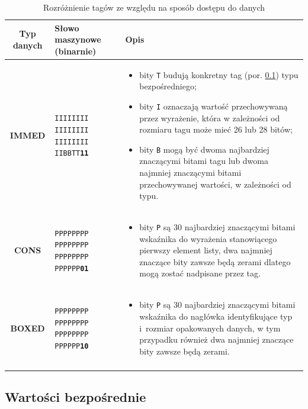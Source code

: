 \begin{longtable}{|c|p{4cm}|p{8cm}|}
\hline

Typ danych & Słowo maszynowe (binarnie) & Opis \\
\endfirsthead
\hline

\textbf{IMMED} & \texttt{IIIIIIII IIIIIIII IIIIIIII IIBBTT\textbf{11}} &
\vspace{-8mm}
\begin{itemize}
\item bity \texttt{T} budują konkretny tag (por. \ref{sub:typyImmediates}) typu bezpośredniego;
\item bity \texttt{I} oznaczają wartość przechowywaną przez wyrażenie, która w zależności od rozmiaru tagu może mieć 26 lub 28 bitów;
\item bity \texttt{B} mogą być dwoma najbardziej znaczącymi bitami tagu lub dwoma najmniej znaczącymi bitami przechowywanej wartości, w zależności od typu.
\end{itemize}  
\vspace{-8mm}
\\
\hline
\textbf{CONS} & \texttt{PPPPPPPP PPPPPPPP PPPPPPPP PPPPPP\textbf{01}} &
\vspace{-8mm}
\begin{itemize}
\item bity \texttt{P} są 30 najbardziej znaczącymi bitami wskaźnika do wyrażenia stanowiącego pierwszy element listy, dwa najmniej znaczące bity zawsze będą zerami dlatego mogą zostać nadpisane przez tag.
\end{itemize}  
\vspace{-8mm}
\\
\hline
\textbf{BOXED} & \texttt{PPPPPPPP PPPPPPPP PPPPPPPP PPPPPP\textbf{10}} &
\vspace{-8mm}
\begin{itemize}
\item bity \texttt{P} są 30 najbardziej znaczącymi bitami wskaźnika do nagłówka identyfikujące typ i~rozmiar opakowanych danych, w tym przypadku również dwa najmniej znaczące bity zawsze będą zerami.
\end{itemize}  
\vspace{-8mm}
 \\
\hline
\caption{Rozróżnienie tagów ze względu na sposób dostępu do danych} 
\label{table:primaryTags} \\
\end{longtable}

\subsection{Wartości bezpośrednie}
\label{sub:typyImmediates}

